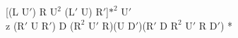 [(L $\text{U}'$) R $\text{U}^2$ ($\text{L}'$ U) $\text{R}'$]$\text{*}^2$ $\text{U}'$\\
z ($\text{R}'$ U $\text{R}'$) D ($\text{R}^2$ $\text{U}'$ R)(U $\text{D}'$)($\text{R}'$ D $\text{R}^2$ $\text{U}'$ R $\text{D}'$) *\\
